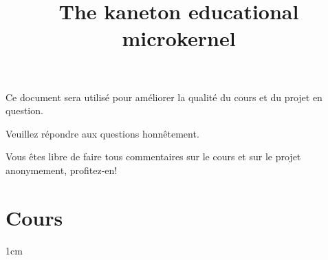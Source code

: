 %
%
%
%
%
%

%
%

%
%

\def\path{../..}

%
%



%
%


%
%

\title{The kaneton educational microkernel}

%
%



%
%

\maketitle

%
%

\begin{center}

\scriptsize{Ce document sera utilis\'e pour am\'eliorer la qualit\'e du
  cours et du projet en question.}

\scriptsize{Veuillez r\'epondre aux questions honn\^etement.}

\scriptsize{Vous \^etes libre de faire tous commentaires sur le cours
  et sur le projet anonymement, profitez-en!}

\end{center}

%
%

%
%

\section{Cours}

         {1cm}

